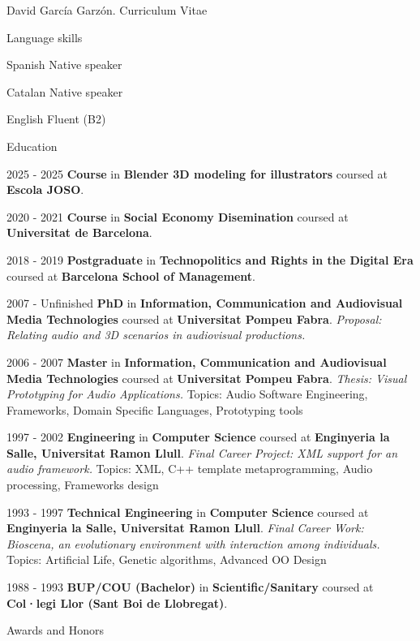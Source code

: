 \documentclass{article}
\begin{document}
\begin{cv}{David García Garzón. Curriculum Vitae}
\begin{cvlist}{Language skills}
\item[Spanish] Native speaker
\item[Catalan] Native speaker
\item[English] Fluent (B2)

\end{cvlist}


\begin{cvlist}{Education}

\item[2025 - 2025]
{\bf Course} in {\bf Blender 3D modeling for illustrators}
coursed at {\bf Escola JOSO}.
{\em }
\item[2020 - 2021]
{\bf Course} in {\bf Social Economy Disemination}
coursed at {\bf Universitat de Barcelona}.
{\em }
\item[2018 - 2019]
{\bf Postgraduate} in {\bf Technopolitics and Rights in the Digital Era}
coursed at {\bf Barcelona School of Management}.
{\em }
\item[2007 - Unfinished]
{\bf PhD} in {\bf Information, Communication and Audiovisual Media Technologies}
coursed at {\bf Universitat Pompeu Fabra}.
{\em Proposal: Relating audio and 3D scenarios in audiovisual productions.}
\item[2006 - 2007]
{\bf Master} in {\bf Information, Communication and Audiovisual Media Technologies}
coursed at {\bf Universitat Pompeu Fabra}.
{\em Thesis: Visual Prototyping for Audio Applications.}
Topics: Audio Software Engineering, Frameworks, Domain Specific Languages, Prototyping tools
\item[1997 - 2002]
{\bf Engineering} in {\bf Computer Science}
coursed at {\bf Enginyeria la Salle, Universitat Ramon Llull}.
{\em Final Career Project: XML support for an audio framework.}
Topics: XML, C++ template metaprogramming, Audio processing, Frameworks design
\item[1993 - 1997]
{\bf Technical Engineering} in {\bf Computer Science}
coursed at {\bf Enginyeria la Salle, Universitat Ramon Llull}.
{\em Final Career Work: Bioscena, an evolutionary environment with interaction among individuals.}
Topics: Artificial Life, Genetic algorithms, Advanced OO Design
\item[1988 - 1993]
{\bf BUP/COU (Bachelor)} in {\bf Scientific/Sanitary}
coursed at {\bf Col·legi Llor (Sant Boi de Llobregat)}.
{\em }
\end{cvlist}

\begin{cvlist}{Awards and Honors}


\end{cvlist}
\end{cv}
\end{document}
